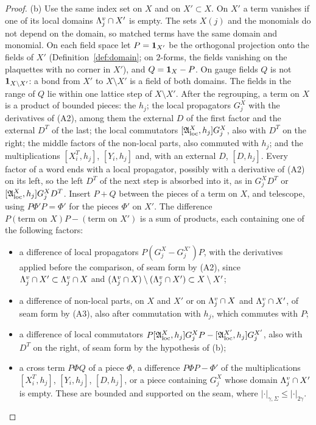 \begin{proof}
(b) Use the same index set on $X$ and on $X'\subset X$. On $X'$ a term vanishes if one of its local domains $\Lambda^v_j\cap X'$ is empty. The sets $X(j)$ and the monomials do not depend on the domain, so matched terms have the same domain and monomial. On each field space let $P=\mathbf 1_{X'}$ be the orthogonal projection onto the fields of $X'$ (Definition~\ref{def:domain}; on $2$-forms, the fields vanishing on the plaquettes with no corner in $X'$), and $Q=\mathbf 1_X-P$. On gauge fields $Q$ is not $\mathbf 1_{X\setminus X'}$: a bond from $X'$ to $X\setminus X'$ is a field of both domains. The fields in the range of $Q$ lie within one lattice step of $X\setminus X'$. After the regrouping, a term on $X$ is a product of bounded pieces: the $h_j$; the local propagators $G^X_j$ with the derivatives of (A2), among them the external $D$ of the first factor and the external $D^T$ of the last; the local commutators $[\mathfrak A^X_{\rm loc},h_j]G^X_j$, also with $D^T$ on the right; the middle factors of the non-local parts, also commuted with $h_j$; and the multiplications $[X_i^T,h_j]$, $[Y_i,h_j]$ and, with an external $D$, $[D,h_j]$. Every factor of a word ends with a local propagator, possibly with a derivative of (A2) on its left, so the left $D^T$ of the next step is absorbed into it, as in $G^X_jD^T$ or $[\mathfrak A^X_{\rm loc},h_j]G^X_jD^T$. Insert $P+Q$ between the pieces of a term on $X$, and telescope, using $P\Phi'P=\Phi'$ for the pieces $\Phi'$ on $X'$. The difference $P(\text{term on }X)P-(\text{term on }X')$ is a sum of products, each containing one of the following factors:
\begin{itemize}
\item a difference of local propagators $P(G^X_j-G^{X'}_j)P$, with the derivatives applied before the comparison, of seam form by (A2), since $\Lambda^v_j\cap X'\subset\Lambda^v_j\cap X$ and $(\Lambda^v_j\cap X)\setminus(\Lambda^v_j\cap X')\subset X\setminus X'$;
\item a difference of non-local parts, on $X$ and $X'$ or on $\Lambda^v_j\cap X$ and $\Lambda^v_j\cap X'$, of seam form by (A3), also after commutation with $h_j$, which commutes with $P$;
\item a difference of local commutators $P[\mathfrak A^X_{\rm loc},h_j]G^X_jP-[\mathfrak A^{X'}_{\rm loc},h_j]G^{X'}_j$, also with $D^T$ on the right, of seam form by the hypothesis of (b);
\item a cross term $P\Phi Q$ of a piece $\Phi$, a difference $P\Phi P-\Phi'$ of the multiplications $[X_i^T,h_j]$, $[Y_i,h_j]$, $[D,h_j]$, or a piece containing $G^X_j$ whose domain $\Lambda^v_j\cap X'$ is empty. These are bounded and supported on the seam, where $|\cdot|_{\gamma,\Sigma}\le|\cdot|_{2\gamma}$.

\end{itemize}
\end{proof}

